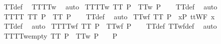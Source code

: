\begin{isabellebody}
\isatagproof
{}\isamarkupfalse%
\ TT{\isacharunderscore}def\ \isamarkupfalse%
\ TT{}{\isacharunderscore}TT{}w\ \isamarkupfalse%
\ auto%
\endisatagproof
{\isafoldproof}%
%
\isadelimproof
\isanewline
%
\endisadelimproof
\isanewline
{}\isamarkupfalse%
\ TT{\isacharunderscore}TT{}w{\isacharcolon}\ {\isachardoublequoteopen}TT\ P\ {\isasymLongrightarrow}\ TT{}w\ P{\isachardoublequoteclose}\isanewline
%
\isadelimproof
\ \ %
\endisadelimproof
%
\isatagproof
{}\isamarkupfalse%
\ TT{\isacharunderscore}def\ \isamarkupfalse%
\ auto%
\endisatagproof
{\isafoldproof}%
%
\isadelimproof
\isanewline
%
\endisadelimproof
\isanewline
{}\isamarkupfalse%
\ TT{\isacharunderscore}TT{}{\isacharcolon}\ {\isachardoublequoteopen}TT\ P\ {\isasymLongrightarrow}\ TT{}\ P{\isachardoublequoteclose}\isanewline
%
\isadelimproof
\ \ %
\endisadelimproof
%
\isatagproof
{}\isamarkupfalse%
\ TT{\isacharunderscore}def\ \isamarkupfalse%
\ auto%
\endisatagproof
{\isafoldproof}%
%
\isadelimproof
\isanewline
%
\endisadelimproof
\isanewline
{}\isamarkupfalse%
\ TT{\isacharunderscore}wf{\isacharcolon}\ {\isachardoublequoteopen}TT\ P\ {\isasymLongrightarrow}\ {\isasymforall}x{\isasymin}P{\isachardot}\ ttWF\ x{\isachardoublequoteclose}\isanewline
%
\isadelimproof
\ \ %
\endisadelimproof
%
\isatagproof
{}\isamarkupfalse%
\ TT{\isacharunderscore}def\ \isamarkupfalse%
\ auto%
\endisatagproof
{\isafoldproof}%
%
\isadelimproof
\isanewline
%
\endisadelimproof
\isanewline
{}\isamarkupfalse%
\ TT{\isacharunderscore}TTwf{\isacharcolon}\ {\isachardoublequoteopen}TT\ P\ {\isasymLongrightarrow}\ TTwf\ P{\isachardoublequoteclose}\isanewline
%
\isadelimproof
\ \ %
\endisadelimproof
%
\isatagproof
{}\isamarkupfalse%
\ TT{\isacharunderscore}def\ TTwf{\isacharunderscore}def\ \isamarkupfalse%
\ auto%
\endisatagproof
{\isafoldproof}%
%
\isadelimproof
\isanewline
%
\endisadelimproof
\isanewline
{}\isamarkupfalse%
\ TT{}{\isacharunderscore}TT{}w{\isacharunderscore}empty{\isacharcolon}\ {\isachardoublequoteopen}TT{}\ P\ {\isasymLongrightarrow}\ TT{}w\ P\ {\isasymLongrightarrow}\ {\isacharbrackleft}{\isacharbrackright}\ {\isasymin}\ P{\isachardoublequoteclose}\isanewline
%
\isadelimproof
\ \ %
\endisadelimproof
%
\isatagproof
{}\isamarkupfalse%

\end{isabellebody}
